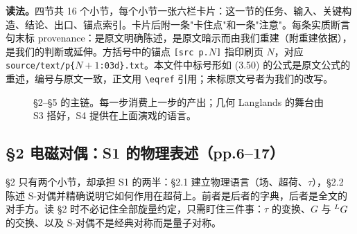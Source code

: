 \textbf{读法。}四节共 16 个小节，每个小节一张六栏卡片：这一节的任务、输入、关键构造、结论、出口、锚点索引。卡片后附一条"卡住点"和一条"注意"。每条实质断言句末标 provenance：\pA 是原文明确陈述，\pB 是原文暗示而由我们重建（附重建依据），\pC 是我们的判断或延伸。方括号中的锚点 \texttt{[src p.$N$]} 指印刷页 $N$，对应 \texttt{source/text/p\{$N+1$:03d\}.txt}。本文件中标号形如 (3.50) 的公式是原文公式的重述，编号与原文一致，正文用 \verb|\eqref| 引用；未标原文号者为我们的改写。\pC

\begin{figure}[htbp]
\centering
{}
\caption{\S2--\S5 的主链。每一步消费上一步的产出；几何 Langlands 的舞台由 S3 搭好，S4 提供在上面演戏的语言。}
\label{l1:fig:chain}
\end{figure}

\subsection*{\S2 电磁对偶：S1 的物理表述（pp.6--17）}

\S2 只有两个小节，却承担 S1 的两半：\S2.1 建立物理语言（场、超荷、$\tau$），\S2.2 陈述 S-对偶并精确说明它如何作用在超荷上。前者是后者的字典，后者是全文的对手方。读 \S2 时不必记住全部旋量约定，只需盯住三件事：$\tau$ 的变换、$G$ 与 ${}^{L}G$ 的交换、以及 S-对偶不是经典对称而是量子对称。\pC{}


